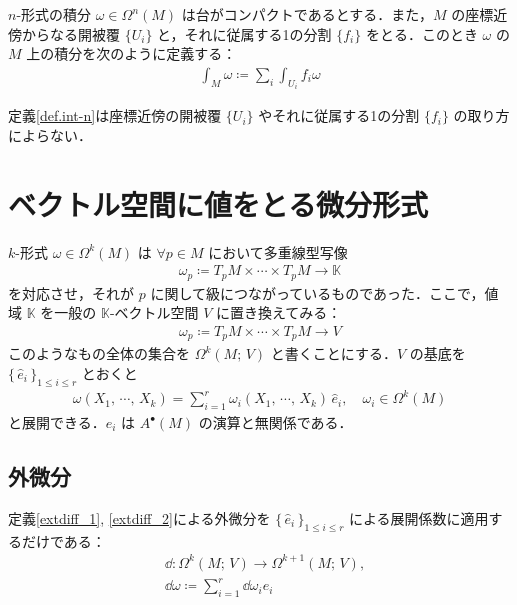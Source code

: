 \documentclass[geometry_main]{subfiles}
\begin{document}
\begin{mydef}[label=def.int-n]{$n$-形式の積分} 
	$\omega \in \Omega^n(M)$ は台がコンパクトであるとする．また，$M$ の座標近傍からなる開被覆 $\{U_i\}$ と，それに従属する1の分割 $\{ f_i \}$ をとる．このとき $\omega$ の $M$ 上の積分を次のように定義する：
	\begin{align} 
		\int_M \omega \coloneqq \sum_{i} \int_{U_i} f_i \omega
	\end{align}
\end{mydef}

\begin{myprop}[]{} 
	定義\ref{def.int-n}は座標近傍の開被覆 $\{U_i\}$ やそれに従属する1の分割 $\{f_i\}$ の取り方によらない．
\end{myprop}

\section{ベクトル空間に値をとる微分形式}

$k$-形式 $\omega \in \Omega^k(M)$ は $\forall p \in M$ において多重線型写像
\begin{align}
	\omega_p \coloneqq T_pM \times \cdots  \times T_pM \to \mathbb{K}
\end{align}
を対応させ，それが $p$ に関して\cinfty 級につながっているものであった．ここで，値域 $\mathbb{K}$ を一般の $\mathbb{K}$-ベクトル空間 $V$ に置き換えてみる：
\begin{align}
	\omega_p \coloneqq T_pM \times \cdots  \times T_pM \to V
\end{align}
このようなもの全体の集合を $\Omega^k(M;\, V)$ と書くことにする．$V$ の基底を $\{\, \hat{e}_i\, \}_{1\le i \le r}$ とおくと
\begin{align}
	\omega(X_1,\, \cdots ,\, X_k) = \sum_{i=1}^r \omega_i(X_1,\, \cdots ,\, X_k)\, \hat{e}_i, \quad \omega_i \in \Omega^k(M)
\end{align}
と展開できる．$\hat{e}_i$ は $A^\bullet(M)$ の演算と無関係である．

\subsection{外微分}

定義\ref{extdiff_1}, \ref{extdiff_2}による外微分を $\{\, \hat{e}_i\, \}_{1\le i \le r}$ による展開係数に適用するだけである：
\begin{align}
	&\dd{} \colon \Omega^k(M;\, V) \to \Omega^{k+1}(M;\, V),\\
	&\dd{\omega} \coloneqq \sum_{i=1}^r \dd{\omega_i} \hat{e}_i
\end{align}
\end{document}

